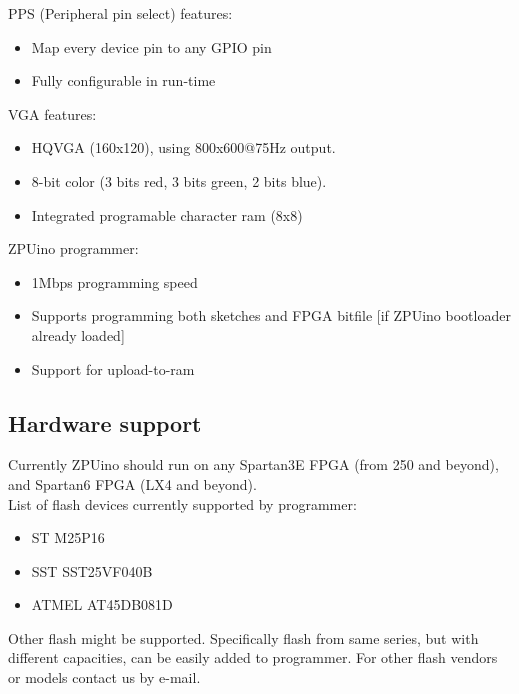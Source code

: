 PPS (Peripheral pin select) features:
\begin{itemize}
\item Map every device pin to any GPIO pin
\item Fully configurable in run-time
\end{itemize}

VGA features:
\begin{itemize}
\item HQVGA (160x120), using 800x600@75Hz output.
\item 8-bit color (3 bits red, 3 bits green, 2 bits blue).
\item Integrated programable character ram (8x8)
\end{itemize}

ZPUino programmer:
\begin{itemize}
\item 1Mbps programming speed
\item Supports programming both sketches and FPGA bitfile [if ZPUino bootloader already loaded]
\item Support for upload-to-ram
\end{itemize}

\subsection{Hardware support}

Currently ZPUino should run on any Spartan3E FPGA (from 250 and beyond), and Spartan6 FPGA (LX4 and beyond). \\
List of flash devices currently supported by programmer:
\begin{itemize}
\item ST M25P16
\item SST SST25VF040B
\item ATMEL AT45DB081D
\end{itemize}
Other flash might be supported. Specifically flash from same series, but with different capacities, can be easily added to programmer.
For other flash vendors or models contact us by e-mail.

